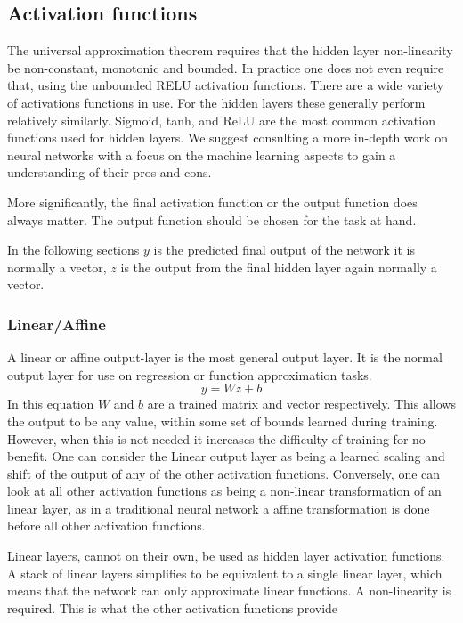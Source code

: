 \documentclass[12pt,parskip]{komatufte}
\begin{document}
\subsection{Activation functions}

The universal approximation theorem requires that the hidden layer non-linearity be non-constant, monotonic and bounded.
In practice one does not even require that, using the unbounded RELU activation functions.
There are a wide variety of activations functions in use.
For the hidden layers these generally perform relatively similarly.
Sigmoid, tanh, and ReLU are the most common activation functions used for hidden layers.
We suggest consulting a more in-depth work on neural networks with a focus on the machine learning aspects to gain a understanding of their pros and cons.

More significantly, the final activation function or the output function does always matter.
The output function should be chosen for the task at hand.

In the following sections $y$ is the predicted final output of the network it is normally a vector, $z$ is the output from the final hidden layer again normally a vector.

\subsubsection{Linear/Affine}
A linear or affine output-layer is the most general output layer.
It is the normal output layer for use on regression or function approximation tasks.
\begin{equation}
y=Wz + b
\end{equation}
In this equation $W$ and $b$ are a trained matrix and vector respectively.
This allows the output to be any value, within some set of bounds learned during training.
However, when this is not needed it increases the difficulty of training for no benefit.
One can consider the Linear output layer as being a learned scaling and shift of the output of any of the other activation functions.
Conversely, one can look at all other activation functions as being a non-linear transformation of an linear layer, as in a traditional neural network a affine transformation is done before all other activation functions.

Linear layers, cannot on their own, be used as hidden layer activation functions.
A stack of linear layers simplifies to be equivalent to a single linear layer, which means that the network can only approximate linear functions.
A non-linearity is required.
This is what the other activation functions provide
\end{document}
